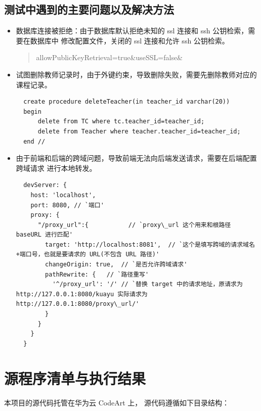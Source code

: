 \documentclass[12pt, a4paper]{article}
\begin{document}
\subsection{测试中遇到的主要问题以及解决方法}
\begin{itemize}
	\item 数据库连接被拒绝：由于数据库默认拒绝未知的 ssl 连接和 ssh 公钥检索，需要在数据库中
	      修改配置文件，关闭的 ssl 连接和允许 ssh 公钥检索。
	      \begin{quotation}
		      allowPublicKeyRetrieval=true\&useSSL=false\&
	      \end{quotation}
	\item 试图删除教师记录时，由于外键约束，导致删除失败，需要先删除教师对应的课程记录。
	      \begin{lstlisting}
  create procedure deleteTeacher(in teacher_id varchar(20))
  begin
      delete from TC where tc.teacher_id=teacher_id;
      delete from Teacher where teacher.teacher_id=teacher_id;
  end //
        \end{lstlisting}
	\item 由于前端和后端的跨域问题，导致前端无法向后端发送请求，需要在后端配置跨域请求
	      进行本地转发。
	      \begin{lstlisting}
  devServer: {
    host: 'localhost',
    port: 8080, // `端口'
    proxy: {
      "/proxy_url":{           // `proxy\_url 这个用来和根路径 baseURL 进行匹配'
        target: 'http://localhost:8081',  // `这个是填写跨域的请求域名+端口号，也就是要请求的 URL(不包含 URL 路径)'
        changeOrigin: true,  // `是否允许跨域请求'
        pathRewrite: {   // `路径重写'
          '^/proxy_url': '/' // `替换 target 中的请求地址，原请求为 http://127.0.0.1:8080/kuayu 实际请求为 http://127.0.0.1:8080/proxy\_url/'
        }
      }
    }
  }        
        \end{lstlisting}
\end{itemize}


\section{源程序清单与执行结果}
本项目的源代码托管在华为云 CodeArt 上， 源代码遵循如下目录结构：
\newpage
\end{document}
